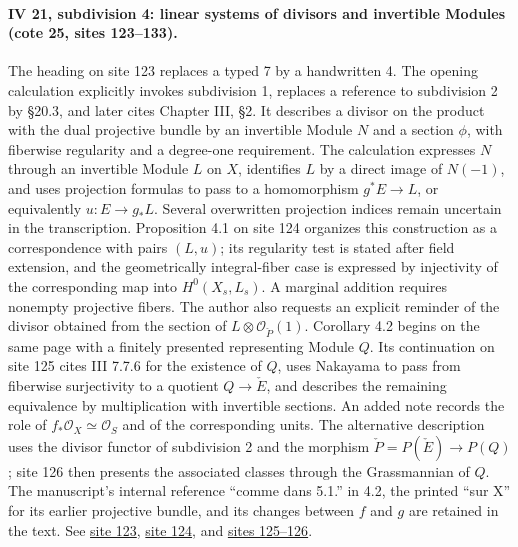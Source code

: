 \documentclass[10pt,a4paper]{article}
\begin{document}
\paragraph{IV 21, subdivision 4: linear systems of divisors and invertible Modules (cote 25, sites 123--133).}
The heading on site 123 replaces a typed 7 by a handwritten 4. The opening calculation explicitly invokes subdivision 1, replaces a reference to subdivision 2 by \S20.3, and later cites Chapter III, \S2. It describes a divisor on the product with the dual projective bundle by an invertible Module \(N\) and a section \(\phi\), with fiberwise regularity and a degree-one requirement. The calculation expresses \(N\) through an invertible Module \(L\) on \(X\), identifies \(L\) by a direct image of \(N(-1)\), and uses projection formulas to pass to a homomorphism \(g^*E\longrightarrow L\), or equivalently \(u:E\longrightarrow g_*L\). Several overwritten projection indices remain uncertain in the transcription. Proposition 4.1 on site 124 organizes this construction as a correspondence with pairs \((L,u)\); its regularity test is stated after field extension, and the geometrically integral-fiber case is expressed by injectivity of the corresponding map into \(H^0(X_s,L_s)\). A marginal addition requires nonempty projective fibers. The author also requests an explicit reminder of the divisor obtained from the section of \(L\otimes\mathcal O_{\check P}(1)\). Corollary 4.2 begins on the same page with a finitely presented representing Module \(Q\). Its continuation on site 125 cites III 7.7.6 for the existence of \(Q\), uses Nakayama to pass from fiberwise surjectivity to a quotient \(Q\longrightarrow\check E\), and describes the remaining equivalence by multiplication with invertible sections. An added note records the role of \(f_*\mathcal O_X\simeq\mathcal O_S\) and of the corresponding units. The alternative description uses the divisor functor of subdivision 2 and the morphism \(\check P=P(\check E)\longrightarrow P(Q)\); site 126 then presents the associated classes through the Grassmannian of \(Q\). The manuscript's internal reference ``comme dans 5.1.'' in 4.2, the printed ``sur X'' for its earlier projective bundle, and its changes between \(f\) and \(g\) are retained in the text. See \href{https://grothendieck.umontpellier.fr/web/viewer.html?file=../25.pdf#page=124}{site 123}, \href{https://grothendieck.umontpellier.fr/web/viewer.html?file=../25.pdf#page=125}{site 124}, and \href{https://grothendieck.umontpellier.fr/web/viewer.html?file=../25.pdf#page=126}{sites 125--126}.
\end{document}
